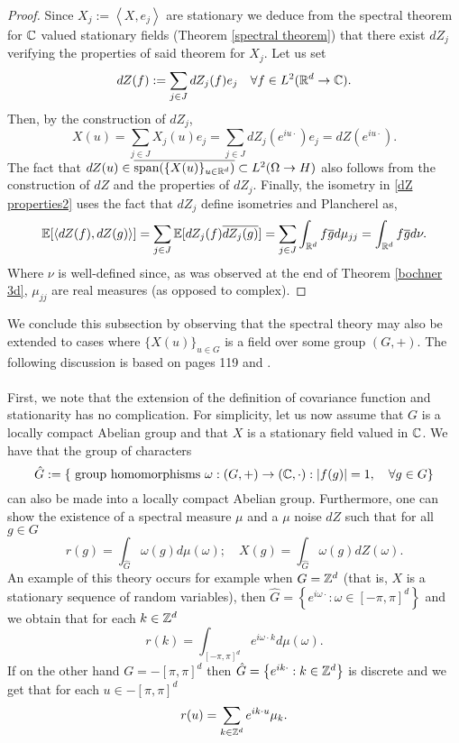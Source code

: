 \documentclass[12pt]{article}
\newcommand{\br}[1]{\left\langle#1\right\rangle}
\begin{document}
\begin{proof}
	Since $X_j:=\br{X,e_j}$ are stationary we deduce from the spectral theorem for $\mathbb{C}$ valued stationary fields (Theorem \ref{spectral theorem}) that there exist $dZ_j$ verifying the properties of said theorem for $X_j$. Let us set
	\begin{equation*}
		dZ(f):=\sum_{j\in J}dZ_j(f)e_j\quad\forall f\in L^2({\mathbb R}^d\to\mathbb{C}).
	\end{equation*}
	Then, by the construction of $dZ_j$,
	\begin{equation*}
		X(u)=\sum_{j\in J}X_j(u) e_j=\sum_{j\in J}dZ_j(e^{iu\cdot})e_j=dZ(e^{iu\cdot}).
	\end{equation*}
	The fact that $dZ(u)\in \overline{\text{span}(\{X(u)\}_{u\in{\mathbb R}^d})}\subset L^2(\Omega\to H)$ also follows from the construction of $dZ$ and the properties of $dZ_j$. Finally, the isometry in \eqref{dZ properties2} uses the fact that $dZ_j$ define isometries and Plancherel as,
	\begin{equation*}
		\E[\br{dZ(f),{dZ(g)}}]=\sum_{j\in J}\E[dZ_j(f)\overline{dZ_j(g)}]=\sum_{j\in J}\int_{\R^d}f\overline{g} d\mu_{jj}=\int_{\R^d}f\overline{g} d\nu.
	\end{equation*}
	Where $\nu$ is well-defined since, as was observed at the end of Theorem \ref{bochner 3d}, $\mu_{jj}$ are real measures (as opposed to complex).
\end{proof}
We conclude this subsection by observing that the spectral theory may also be extended to cases where $\{X(u)\}_{u\in G}$ is a field over some group $(G,+)$. The following discussion is based on \cite{adler2007random} pages 119 and \cite{yaglom1961second}. \\
\\
First, we note that the extension of the definition of covariance function and stationarity has no complication. For simplicity, let us now assume that $G$ is a locally compact Abelian group and that $X$ is a stationary field valued in $\mathbb{C}$. We have that the group of characters
$$\hat{G}:=\{\text{ group homomorphisms } \omega:(G,+)\to(\mathbb{C},\cdot): \abs{f(g)}=1,\quad\forall g\in G\}$$ can also be made into a locally compact Abelian group. Furthermore, one can show the existence of a spectral measure $\mu$ and a $\mu$ noise $dZ$ such that for all $g\in G$
\begin{equation*}
	r(g)=\int_{\hat{G}}\omega(g)d\mu(\omega);\quad X(g)=\int_{\hat{G}}\omega(g)dZ(\omega).
\end{equation*}
An example of this theory occurs for example when $G={\mathbb Z}^d$ (that is, $X$ is a stationary sequence of random variables), then
$
	\hat{G}=\left\{e^{i\omega \cdot}:\omega\in[-\pi,\pi]^d\right\}
$
and we obtain that for each $k\in{\mathbb Z}^d$
\begin{equation*}
	r(k)=\int_{[-\pi,\pi]^d}e^{i\omega \cdot k}d\mu(\omega).
\end{equation*}
If on the other hand $G=-[\pi,\pi]^d$ then $
	\hat{G}=\left\{e^{ik \cdot}:k\in{\mathbb Z}^d\right\}
$ is discrete
and we get that for each $u\in-[\pi,\pi]^d $
\begin{equation*}
	r(u)=\sum_{k\in{\mathbb Z}^d}e^{ik \cdot u}\mu_k.
\end{equation*}
\end{document}
